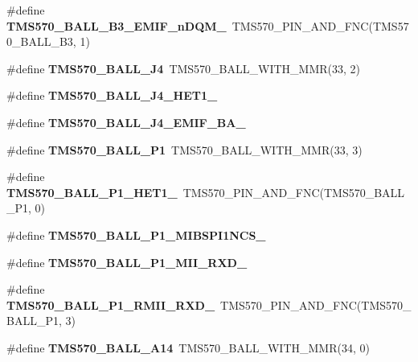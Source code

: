 \begin{DoxyCompactItemize}
\#define {\bfseries T\+M\+S570\+\_\+\+B\+A\+L\+L\+\_\+\+B3\+\_\+\+E\+M\+I\+F\+\_\+n\+D\+Q\+M\+\_}~T\+M\+S570\+\_\+\+P\+I\+N\+\_\+\+A\+N\+D\+\_\+\+F\+NC(T\+M\+S570\+\_\+\+B\+A\+L\+L\+\_\+\+B3, 1)
\item 
\mbox{\label{tms570lc4357-pins_8h_a0441d79ba03276635343448bf86eab70}} 
\#define {\bfseries T\+M\+S570\+\_\+\+B\+A\+L\+L\+\_\+\+J4}~T\+M\+S570\+\_\+\+B\+A\+L\+L\+\_\+\+W\+I\+T\+H\+\_\+\+M\+MR(33, 2)
\item 
\#define {\bfseries T\+M\+S570\+\_\+\+B\+A\+L\+L\+\_\+\+J4\+\_\+\+H\+E\+T1\+\_}
\item 
\#define {\bfseries T\+M\+S570\+\_\+\+B\+A\+L\+L\+\_\+\+J4\+\_\+\+E\+M\+I\+F\+\_\+\+B\+A\+\_}
\item 
\mbox{\label{tms570lc4357-pins_8h_a005b2383f67e08e17657931e7163e116}} 
\#define {\bfseries T\+M\+S570\+\_\+\+B\+A\+L\+L\+\_\+\+P1}~T\+M\+S570\+\_\+\+B\+A\+L\+L\+\_\+\+W\+I\+T\+H\+\_\+\+M\+MR(33, 3)
\item 
\mbox{\label{tms570lc4357-pins_8h_a00dd1ebdb23c58563401a02af2a74598}} 
\#define {\bfseries T\+M\+S570\+\_\+\+B\+A\+L\+L\+\_\+\+P1\+\_\+\+H\+E\+T1\+\_}~T\+M\+S570\+\_\+\+P\+I\+N\+\_\+\+A\+N\+D\+\_\+\+F\+NC(T\+M\+S570\+\_\+\+B\+A\+L\+L\+\_\+\+P1, 0)
\item 
\#define {\bfseries T\+M\+S570\+\_\+\+B\+A\+L\+L\+\_\+\+P1\+\_\+\+M\+I\+B\+S\+P\+I1\+N\+C\+S\+\_}
\item 
\#define {\bfseries T\+M\+S570\+\_\+\+B\+A\+L\+L\+\_\+\+P1\+\_\+\+M\+I\+I\+\_\+\+R\+X\+D\+\_}
\item 
\mbox{\label{tms570lc4357-pins_8h_a044c553ee82a977879a6245ff60a5a0a}} 
\#define {\bfseries T\+M\+S570\+\_\+\+B\+A\+L\+L\+\_\+\+P1\+\_\+\+R\+M\+I\+I\+\_\+\+R\+X\+D\+\_}~T\+M\+S570\+\_\+\+P\+I\+N\+\_\+\+A\+N\+D\+\_\+\+F\+NC(T\+M\+S570\+\_\+\+B\+A\+L\+L\+\_\+\+P1, 3)
\item 
\mbox{\label{tms570lc4357-pins_8h_ae013a9ee114fabeb3f4bc953863df820}} 
\#define {\bfseries T\+M\+S570\+\_\+\+B\+A\+L\+L\+\_\+\+A14}~T\+M\+S570\+\_\+\+B\+A\+L\+L\+\_\+\+W\+I\+T\+H\+\_\+\+M\+MR(34, 0)
\item 
\mbox{\label{tms570lc4357-pins_8h_a7a2714b05d1e1cb159ce0b7abd97f3ad}} 

\end{DoxyCompactItemize}
